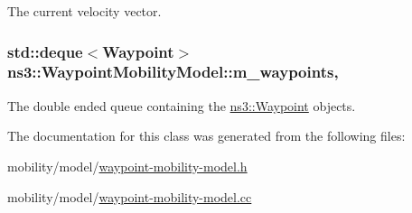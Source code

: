 The current velocity vector. 

\subsubsection[{\texorpdfstring{m\+\_\+waypoints}{m_waypoints}}]{\setlength{\rightskip}{0pt plus 5cm}std\+::deque$<${\bf Waypoint}$>$ ns3\+::\+Waypoint\+Mobility\+Model\+::m\+\_\+waypoints\hspace{0.3cm}{\ttfamily [mutable]}, {\ttfamily [private]}}\hypertarget{classns3_1_1WaypointMobilityModel_a8d30b488d6461e335cb443272528a29e}{}\label{classns3_1_1WaypointMobilityModel_a8d30b488d6461e335cb443272528a29e}


The double ended queue containing the \hyperlink{classns3_1_1Waypoint}{ns3\+::\+Waypoint} objects. 



The documentation for this class was generated from the following files\+:\begin{DoxyCompactItemize}
\item 
mobility/model/\hyperlink{waypoint-mobility-model_8h}{waypoint-\/mobility-\/model.\+h}\item 
mobility/model/\hyperlink{waypoint-mobility-model_8cc}{waypoint-\/mobility-\/model.\+cc}\end{DoxyCompactItemize}

